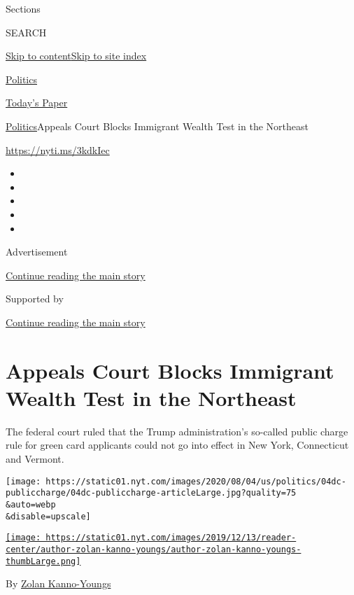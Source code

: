 Sections

SEARCH

\protect\hyperlink{site-content}{Skip to
content}\protect\hyperlink{site-index}{Skip to site index}

\href{https://www.nytimes.com/section/politics}{Politics}

\href{https://myaccount.nytimes.com/auth/login?response_type=cookie\&client_id=vi}{}

\href{https://www.nytimes.com/section/todayspaper}{Today's Paper}

\href{/section/politics}{Politics}\textbar{}Appeals Court Blocks
Immigrant Wealth Test in the Northeast

\url{https://nyti.ms/3kdkIec}

\begin{itemize}
\item
\item
\item
\item
\item
\end{itemize}

Advertisement

\protect\hyperlink{after-top}{Continue reading the main story}

Supported by

\protect\hyperlink{after-sponsor}{Continue reading the main story}

\hypertarget{appeals-court-blocks-immigrant-wealth-test-in-the-northeast}{%
\section{Appeals Court Blocks Immigrant Wealth Test in the
Northeast}\label{appeals-court-blocks-immigrant-wealth-test-in-the-northeast}}

The federal court ruled that the Trump administration's so-called public
charge rule for green card applicants could not go into effect in New
York, Connecticut and Vermont.

\texttt{[image: https://static01.nyt.com/images/2020/08/04/us/politics/04dc-publiccharge/04dc-publiccharge-articleLarge.jpg?quality=75\\\&auto=webp\\\&disable=upscale]}

\href{https://www.nytimes.com/by/zolan-kanno-youngs}{\texttt{[image: https://static01.nyt.com/images/2019/12/13/reader-center/author-zolan-kanno-youngs/author-zolan-kanno-youngs-thumbLarge.png]}}

By \href{https://www.nytimes.com/by/zolan-kanno-youngs}{Zolan
Kanno-Youngs}

